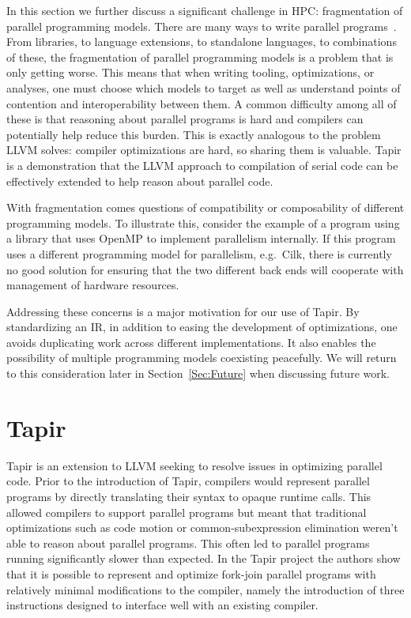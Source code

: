 \documentclass[sigconf]{acmart}
\begin{document}
In this section we further discuss a significant challenge in HPC:
fragmentation of parallel programming models. There are many ways to write
parallel programs~\cite{openmp, qthreads, chapel, cilk, kokkos, legion, upc,
mpi}.  From libraries, to language extensions, to standalone languages, to
combinations of these, the fragmentation of parallel programming models is a
problem that is only getting worse. This means that when writing tooling,
optimizations, or analyses, one must choose which models to target as well as
understand points of contention and interoperability between them. A common
difficulty among all of these is that reasoning about parallel programs is hard
and compilers can potentially help reduce this burden. This is exactly
analogous to the problem LLVM solves: compiler optimizations are hard, so
sharing them is valuable. Tapir is a demonstration that the LLVM approach to
compilation of serial code can be effectively extended to help reason about
parallel code.

With fragmentation comes questions of compatibility or composability of
different programming models. To illustrate this, consider the example of
a program using a library that uses OpenMP to implement parallelism internally.
If this program uses a different programming model for parallelism, e.g.\ Cilk,
there is currently no good solution for ensuring that the two different back ends
will cooperate with management of hardware resources.

Addressing these concerns is a major motivation for our use of Tapir.  By
standardizing an IR, in addition to easing the development of optimizations,
one avoids duplicating work across different implementations. It also enables
the possibility of multiple programming models coexisting peacefully. We will
return to this consideration later in Section~\ref{Sec:Future} when
discussing future work.

\section{Tapir} \label{Sec:Tapir}
Tapir is an extension to LLVM
seeking to resolve issues in optimizing parallel code. Prior to
the introduction of Tapir, compilers would represent parallel programs
by directly translating their syntax to opaque runtime calls. This allowed
compilers to support parallel programs but meant that traditional
optimizations such as code motion or common-subexpression elimination weren't
able to reason about parallel programs. This often led to parallel programs
running significantly slower than expected. In the Tapir project the authors
show that it is possible to represent and optimize fork-join parallel programs
with relatively minimal modifications to the compiler, namely the introduction
of three instructions designed to interface well with an existing compiler.
\end{document}
